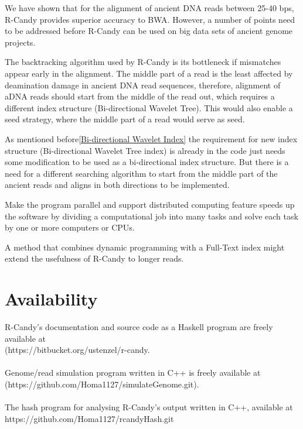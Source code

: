 \documentclass[11pt,a4paper]{report}
\begin{document}
We have shown that for the alignment of ancient DNA reads between 25-40 
bps, R-Candy provides superior accuracy to BWA. However, a number of points 
need to be addressed before R-Candy can be used on big data sets of ancient
genome projects. 


The backtracking algorithm used by R-Candy is its bottleneck if mismatches 
appear early in the alignment. The middle part of a read is the least
affected by deamination damage in ancient DNA read sequences,
therefore, alignment of aDNA reads should start from the middle of the 
read out, which requires a different index structure (Bi-directional Wavelet 
Tree). This would also enable a seed strategy, where the middle part of a read
would serve as seed.

As mentioned before\ref{Bi-directional Wavelet Index} the requirement for new index
structure (Bi-directional Wavelet Tree index) is already in the code just
needs some modification to be used as a bi-directional index structure. 
But there is a need for a different searching algorithm to start from the 
middle part of the ancient reads and aligns in both directions to be implemented.


Make the program parallel and support distributed computing feature
speeds up the software by dividing a computational job into many tasks 
and solve each task by one or more computers or CPUs.

A method that combines dynamic programming with a Full-Text index might 
extend the usefulness of R-Candy to longer reads.


\section{Availability} \label{Availability}

R-Candy's documentation and source code as a Haskell program are freely
available at\\
 (https://bitbucket.org/ustenzel/r-candy.
\\\\
Genome/read simulation program written in C++ is freely available at
(https://github.com/Homa1127/simulateGenome.git).
\\\\
The hash program for analysing R-Candy's output written in C++, available at
https://github.com/Homa1127/rcandyHash.git
\end{document}
